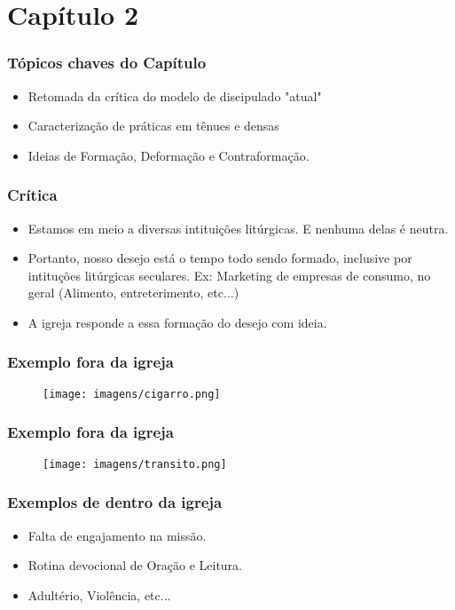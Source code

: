 \section{Capítulo 2}

\begin{frame}
	\frametitle{Tópicos chaves do Capítulo}

	\begin{itemize}
		\item Retomada da crítica do modelo de discipulado "atual"
		\item Caracterização de práticas em tênues e densas
		\item Ideias de Formação, Deformação e Contraformação.
	\end{itemize}
\end{frame}

\begin{frame}
	\frametitle{Crítica}

	\begin{itemize}
		\item <1> Estamos em meio a diversas intituições litúrgicas. E nenhuma delas é neutra.
		\item <2> Portanto, nosso desejo está o tempo todo sendo formado, inclusive por intituções litúrgicas seculares. Ex: Marketing de empresas de consumo, no geral (Alimento, entreterimento, etc...)
		\item <3> A igreja responde a essa formação do desejo com ideia.
	\end{itemize}
\end{frame}

\begin{frame}
	\frametitle{Exemplo fora da igreja}
    \begin{figure}[h]
        \texttt{[image: imagens/cigarro.png]}
    \end{figure}
\end{frame}

\begin{frame}
	\frametitle{Exemplo fora da igreja}
    \begin{figure}[h]
        \texttt{[image: imagens/transito.png]}
    \end{figure}
\end{frame}

\begin{frame}
	\frametitle{Exemplos de dentro da igreja}
    \begin{itemize}
        \item Falta de engajamento na missão.
        \item Rotina devocional de Oração e Leitura.
        \item Adultério, Violência, etc...
    \end{itemize}
\end{frame}

